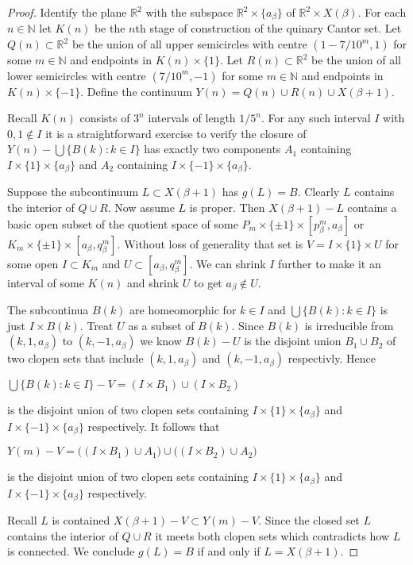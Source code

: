 \documentclass[12pt]{article}
\theoremstyle{plain}
\theoremstyle{definition}
\newcommand{\B}{\ensuremath{\beta}}
\newcommand{\RR}{\ensuremath{\mathbb R}}
\newcommand{\NN}{\ensuremath{\mathbb N}}
\newcommand{\0}{\ensuremath{\varnothing}}
\begin{document}
	\begin{proof}
		
		Identify the plane $\RR^2$ with the subspace $\RR^2 \times \{a_{\B}\}$ of $\RR^2 \times X(\B)$.
		For each $n \in \NN$ let $K(n)$ be the $n$th stage of construction of the quinary Cantor set.
		Let $Q(n)\subset \RR^2$ be the union of all upper semicircles with centre $(1- 7/10^m,1)$ for some $m \in \NN$ and endpoints in $K(n) \times \{1\}$.
		Let $R(n)\subset \RR^2$ be the union of all lower semicircles with centre $(7/10^m,-1)$ for some $m \in \NN$ and endpoints in $K(n) \times \{-1\}$.
		Define the continuum $Y(n) = Q(n) \cup R(n) \cup X(\B+1)$.
		
		Recall $K(n)$ consists of $3^n$ intervals of length $1/5^n$.
		For any such interval $I$ with $0,1 \notin I$
		it is a straightforward exercise to verify the closure of $Y(n) - \bigcup \{B(k): k \in I\}$ has exactly two components
		$A_1$ containing $I \times \{1\} \times \{a_\B\}$ and $A_2$ containing $I \times \{-1\} \times \{a_\B\}$.
		
		Suppose the subcontinuum $L \subset X(\B+1)$ has $g(L) = B$.
		Clearly $L$ contains the interior of $Q \cup R$.
		Now assume $L$ is proper. 
		Then $X(\B+1) - L$ contains a basic open subset of the quotient space of some
		\mbox{$P_m \times \{\pm 1\} \times [p^m_\B, a_\B]$} or  \mbox{$K_m \times \{\pm 1\} \times [a_\B, q^m_\B]$}.
		Without loss of generality that set is $V = I \times \{1\} \times U$ for some open  $I \subset K_m$ and $U \subset [a_\B, q^m_\B]$.
		We can shrink $I$ further to make it an interval of some $K(n)$ and shrink $U$ to get $a_\B \notin U$.
		
		The subcontinua $B(k)$ are homeomorphic for $k \in I$ 
		and $\bigcup \{ B(k): k \in I \}$ is just $I \times B(k)$.
		Treat $U$ as a subset of $B(k)$.
		Since $B(k)$ is irreducible from $(k,1,a_\B)$ to $(k,-1,a_\B)$ we know $B(k) - U$ is the disjoint union 
		$B_1 \cup B_2$ of two clopen sets that include $(k,1,a_\B)$ and $(k,-1,a_\B)$ respectivly.
		Hence  
		
		\begin{center}
			$\bigcup \{B(k):k \in I\} -V = (I \times B_1) \cup  (I \times B_2)$
		\end{center} 
		
		is the disjoint union of two clopen sets containing $I \times \{1\} \times \{a_\B\}$ and \mbox{$I \times \{-1\} \times \{a_\B\}$} respectively.
		It follows that
		
		\begin{center}
			$Y(m) -V = \big ( (I \times B_1) \cup A_1 \big ) \cup \big ( (I \times B_2) \cup A_2 \big )$
		\end{center} 
		
		is the disjoint union of two clopen sets containing $I \times \{1\} \times \{a_\B\}$ and \mbox{$I \times \{-1\} \times \{a_\B\}$} respectively.
		
		Recall $L$ is contained $X(\B+1)-V \subset Y(m) -V$.
		Since the closed set $L$ contains the interior of $Q \cup R$ 
		it meets both clopen sets which contradicts how $L$ is connected.
		We conclude $g(L) = B$ if and only if $L = X(\B+1)$.
	\end{proof}
	
\end{document}

